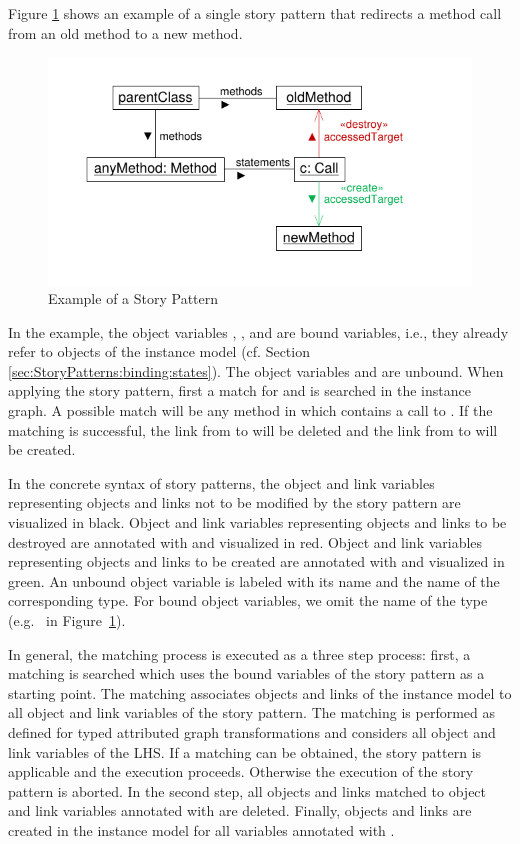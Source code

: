 Figure \ref{fig:simpleStoryPattern} shows an example of a single story pattern that redirects a method call from an old method to a new method.
\begin{figure}[htbp]
  \centering
  \includegraphics[scale=1.0]{figures/SimpleStoryPattern}
  \caption{Example of a Story Pattern}
  \label{fig:simpleStoryPattern}
\end{figure}
In the example, the object variables , , and  are bound variables, i.e., they already refer to objects of the instance model (cf. Section \ref{sec:StoryPatterns:binding:states}).
The object variables  and  are unbound. 
When applying the story pattern, first a match for  and  is searched in the instance graph. 
A possible match will be any method in  which contains a call to . 
If the matching is successful, the link from  to  will be deleted and the link from  to  will be created.

In the concrete syntax of story patterns, the object and link variables representing objects and links not to be modified by the story pattern are visualized in black. 
Object and link variables representing objects and links to be destroyed are annotated with \destroy and visualized in red. 
Object and link variables representing objects and links to be created are annotated with \create and visualized in green. 
An unbound object variable is labeled with its name and the name of the corresponding type. 
For bound object variables, we omit the name of the type (e.g.\  in Figure~\ref{fig:simpleStoryPattern}).

In general, the matching process is executed as a three step process:
first, a matching is searched which uses the bound variables of the story pattern as a starting point. The matching associates objects and links of the instance model to all object and link variables of the story pattern. 
The matching is performed as defined for typed attributed graph transformations and considers all object and link variables of the LHS.
If a matching can be obtained, the story pattern is applicable and the execution proceeds. 
Otherwise the execution of the story pattern is aborted.
In the second step, all objects and links matched to object and link variables annotated with \destroy are deleted. 
Finally, objects and links are created in the instance model for all variables annotated with \create.

